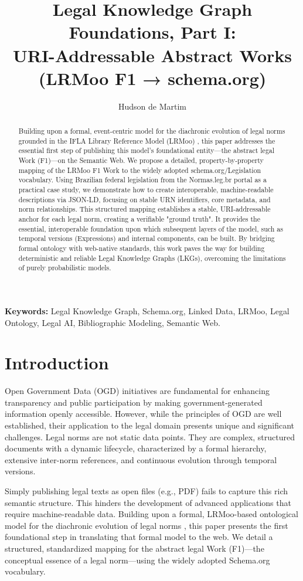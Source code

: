 \documentclass[11pt]{article}
\title{Legal Knowledge Graph Foundations, Part I: \\ URI-Addressable Abstract Works (LRMoo F1 → schema.org)}
\author[1]{Hudson de Martim}
\affil[1]{Federal Senate of Brazil \\ \texttt{hudsonm@senado.leg.br}}
\date{}
\begin{document}
\maketitle

\begin{abstract}
Building upon a formal, event-centric model for the diachronic evolution of legal norms grounded in the IFLA Library Reference Model (LRMoo) \cite{demartim2025temporal}, this paper addresses the essential first step of publishing this model's foundational entity—the abstract legal Work (F1)—on the Semantic Web. We propose a detailed, property-by-property mapping of the LRMoo F1 Work to the widely adopted schema.org/Legislation vocabulary. Using Brazilian federal legislation from the Normas.leg.br portal as a practical case study, we demonstrate how to create interoperable, machine-readable descriptions via JSON-LD, focusing on stable URN identifiers, core metadata, and norm relationships. This structured mapping establishes a stable, URI-addressable anchor for each legal norm, creating a verifiable "ground truth". It provides the essential, interoperable foundation upon which subsequent layers of the model, such as temporal versions (Expressions) and internal components, can be built. By bridging formal ontology with web-native standards, this work paves the way for building deterministic and reliable Legal Knowledge Graphs (LKGs), overcoming the limitations of purely probabilistic models.
\end{abstract}

\noindent\textbf{Keywords:}  Legal Knowledge Graph, Schema.org, Linked Data, LRMoo, Legal Ontology,  Legal AI, Bibliographic Modeling, Semantic Web.

\section{Introduction}

Open Government Data (OGD) initiatives are fundamental for enhancing transparency and public participation by making government-generated information openly accessible. However, while the principles of OGD are well established, their application to the legal domain presents unique and significant challenges. Legal norms are not static data points. They are complex, structured documents with a dynamic lifecycle, characterized by a formal hierarchy, extensive inter-norm references, and continuous evolution through temporal versions.

Simply publishing legal texts as open files (e.g., PDF) fails to capture this rich semantic structure. This hinders the development of advanced applications that require machine-readable data. Building upon a formal, LRMoo-based ontological model for the diachronic evolution of legal norms \cite{demartim2025temporal}, this paper presents the first foundational step in translating that formal model to the web. We detail a structured, standardized mapping for the abstract legal Work (F1)—the conceptual essence of a legal norm—using the widely adopted Schema.org vocabulary.
\end{document}
